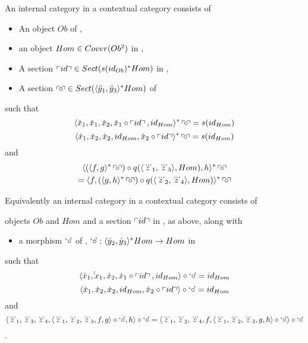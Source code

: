 \begin{lemma}
\label{internalcategorylemma}
An internal category in a contextual category \catcw consists of
\begin{itemize}
\item An object $Ob$ of \catc,
\item an object $Hom \in Cover(Ob^2)$ in \catc,
\item A section $\left\ulcorner id\right\urcorner \in Sect(s(id_{Ob})^*Hom)$ in \catc, 
\item A section $\left\ulcorner\kern-2pt\circ \kern-2pt\right\urcorner \in Sect(\langle\ddot y_1,\ddot y_3\rangle^*Hom) $ of \catc 											
\end{itemize}
such that
\begin{equation}
\label{leftidentityaxiom}
\leftidentitymapped
\end{equation}
\begin{equation}
\label{rightidentityaxiom}
\rightidentitymapped
\end{equation}
and
\begin{multline}
\label{associativityaxiom}
\assoclhsremapped\\
            = \assocrhsremapped
\end{multline}


Equivalently an internal category in a contextual category \catcw consists of
\item objects $Ob$ and  $Hom$  and a section $\left\ulcorner id\right\urcorner$ in \catc,  as above, along with
\begin{itemize}
\item a morphism $\text{`$\circ$\kern-2pt'}$ of \catc, $\text{`$\circ$\kern-2pt'}: \langle\dot y_2,\dot y_3\rangle^*Hom \rightarrow Hom$ in \catc
\end{itemize}
such that
\begin{equation}
\label{leftidentityrepresentation2}
\tuple{\dot x_1,\dot \dot x_1,\dot x_2,\dot x_1\circ \fid,id_{Hom}} \circ \compmorph =id_{Hom}
\end{equation}
\begin{equation}
\label{rightidentityrepresentation2}
\tuple{\dot x_1,\dot x_2,\dot x_2,id_{Hom},\dot x_2 \circ \fid} \circ \compmorph =id_{Hom}
\end{equation}
and
\begin{equation}
\label{associativityrepresentation2}
\assocequivalentlhs = \assocequivalentrhs
\end{equation}.
\end{lemma}
